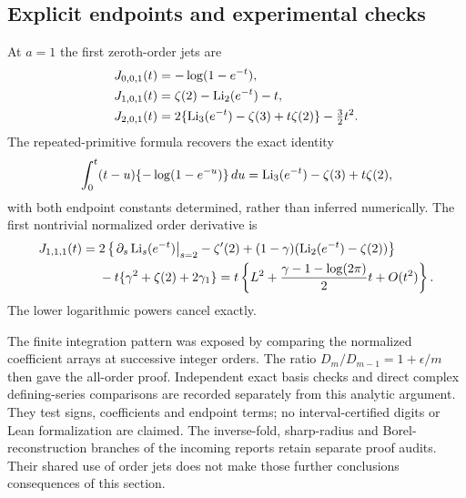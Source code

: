 \subsection{Explicit endpoints and experimental checks}
At $a=1$ the first zeroth-order jets are
\begin{align*}
 J_{0,0,1}(t)&=-\log(1-e^{-t}),\\
 J_{1,0,1}(t)&=\zeta(2)-\operatorname{Li}_2(e^{-t})-t,\\
 J_{2,0,1}(t)&=2\{\operatorname{Li}_3(e^{-t})-\zeta(3)+t\zeta(2)\}
                         -\tfrac32t^2 .
\end{align*}
The repeated-primitive formula recovers the exact identity
\[
 \int_0^t(t-u)\{-\log(1-e^{-u})\}\,du
       =\operatorname{Li}_3(e^{-t})-\zeta(3)+t\zeta(2),
\]
with both endpoint constants determined, rather than inferred numerically.
The first nontrivial normalized order derivative is
\begin{align}
 J_{1,1,1}(t)
 ={}&2\left\{\left.\partial_s\operatorname{Li}_s(e^{-t})\right|_{s=2}
       -\zeta'(2)+(1-\gamma)(\operatorname{Li}_2(e^{-t})-\zeta(2))\right\}
       \notag\\
 &-t\{\gamma^2+\zeta(2)+2\gamma_1\}
 =t\left\{L^2+\frac{\gamma-1-\log(2\pi)}2t+O(t^2)\right\}.
 \label{rj:first-jet}
\end{align}
The lower logarithmic powers cancel exactly.

The finite integration pattern was exposed by comparing the normalized
coefficient arrays at successive integer orders. The ratio
$D_m/D_{m-1}=1+\epsilon/m$ then gave the all-order proof.
Independent exact basis checks and direct complex defining-series
comparisons are recorded separately from this analytic argument.
They test signs, coefficients and endpoint terms; no interval-certified
digits or Lean formalization are claimed.
The inverse-fold, sharp-radius and Borel-reconstruction branches of the
incoming reports retain separate proof audits. Their shared use of order
jets does not make those further conclusions consequences of this section.
